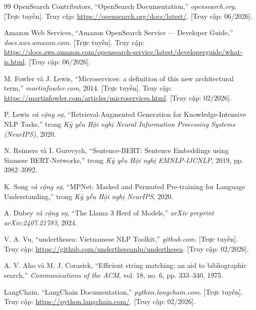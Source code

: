 \begin{thebibliography}{99}
OpenSearch Contributors, ``OpenSearch Documentation,'' \textit{opensearch.org}. [Trực tuyến]. Truy cập: \url{https://opensearch.org/docs/latest/}. [Truy cập: 06/2026].

Amazon Web Services, ``Amazon OpenSearch Service --- Developer Guide,'' \textit{docs.aws.amazon.com}. [Trực tuyến]. Truy cập: \url{https://docs.aws.amazon.com/opensearch-service/latest/developerguide/what-is.html}. [Truy cập: 06/2026].

M. Fowler và J. Lewis, ``Microservices: a definition of this new architectural term,'' \textit{martinfowler.com}, 2014. [Trực tuyến]. Truy cập: \url{https://martinfowler.com/articles/microservices.html}. [Truy cập: 02/2026].

P. Lewis \textit{và cộng sự}, ``Retrieval-Augmented Generation for Knowledge-Intensive NLP Tasks,'' trong \textit{Kỷ yếu Hội nghị Neural Information Processing Systems (NeurIPS)}, 2020.

N. Reimers và I. Gurevych, ``Sentence-BERT: Sentence Embeddings using Siamese BERT-Networks,'' trong \textit{Kỷ yếu Hội nghị EMNLP-IJCNLP}, 2019, pp. 3982--3992.

K. Song \textit{và cộng sự}, ``MPNet: Masked and Permuted Pre-training for Language Understanding,'' trong \textit{Kỷ yếu Hội nghị NeurIPS}, 2020.

A. Dubey \textit{và cộng sự}, ``The Llama 3 Herd of Models,'' \textit{arXiv preprint arXiv:2407.21783}, 2024.

V. A. Vu, ``underthesea: Vietnamese NLP Toolkit,'' \textit{github.com}. [Trực tuyến]. Truy cập: \url{https://github.com/undertheseanlp/underthesea}. [Truy cập: 02/2026].

A. V. Aho và M. J. Corasick, ``Efficient string matching: an aid to bibliographic search,'' \textit{Communications of the ACM}, vol. 18, no. 6, pp. 333--340, 1975.

LangChain, ``LangChain Documentation,'' \textit{python.langchain.com}. [Trực tuyến]. Truy cập: \url{https://python.langchain.com/}. [Truy cập: 02/2026].


\end{thebibliography}
